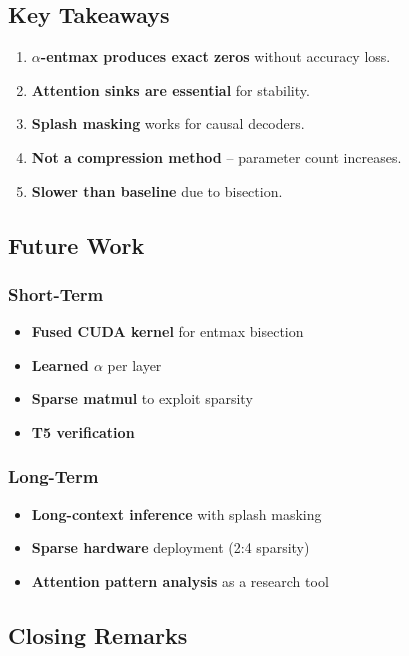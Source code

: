 \subsection{Key Takeaways}

\begin{enumerate}
\item \textbf{$\alpha$-entmax produces exact zeros} without accuracy loss.
\item \textbf{Attention sinks are essential} for stability.
\item \textbf{Splash masking} works for causal decoders.
\item \textbf{Not a compression method} -- parameter count increases.
\item \textbf{Slower than baseline} due to bisection.

\end{enumerate}
\subsection{Future Work}

\subsubsection{Short-Term}
\begin{itemize}
\item \textbf{Fused CUDA kernel} for entmax bisection
\item \textbf{Learned $\alpha$} per layer
\item \textbf{Sparse matmul} to exploit sparsity
\item \textbf{T5 verification}

\end{itemize}
\subsubsection{Long-Term}
\begin{itemize}
\item \textbf{Long-context inference} with splash masking
\item \textbf{Sparse hardware} deployment (2:4 sparsity)
\item \textbf{Attention pattern analysis} as a research tool

\end{itemize}
\subsection{Closing Remarks}

